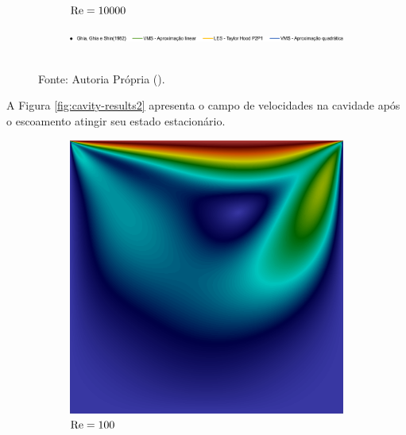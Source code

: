 \begin{figure}[h]
\begin{subfigure}{0.4\textwidth}
    \caption{$\mathrm{Re}=10000$}
    \end{subfigure}
    \begin{subfigure}{\textwidth}
    \includegraphics[width=\linewidth]{Figuras/Cavity/Legenda.pdf}
    \end{subfigure}
    \\Fonte: Autoria Própria (\the\year).
    \label{fig:cavity-results}
\end{figure}

A Figura \ref{fig:cavity-results2} apresenta o campo de velocidades na cavidade após o escoamento atingir seu estado estacionário.

\begin{figure}[h]
    \centering
    \caption{Campo de velocidades em regime estacionário na cavidade.}
    \begin{subfigure}{0.32\textwidth}
    \includegraphics[width=\linewidth]{Figuras/Cavity/Re100.png}
    \caption{$\mathrm{Re}=100$}
    \end{subfigure}
    \begin{subfigure}{0.32\textwidth}

\end{subfigure}
\end{figure}
